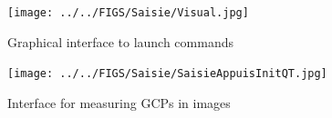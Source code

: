 \documentclass[twocolumn]{bmcart}%
\begin{document}
\begin{backmatter}
\begin{figure}
 \texttt{[image: ../../FIGS/Saisie/Visual.jpg]}
 \caption{Graphical interface to launch commands}\label{fig:visuInterfaceV}
 \end{figure}
%
\begin{figure}
 \texttt{[image: ../../FIGS/Saisie/SaisieAppuisInitQT.jpg]}
 \caption{Interface for measuring GCPs in images}\label{fig:SaisieGCP}
 \end{figure}
%
%
 

\end{backmatter}
\end{document}
